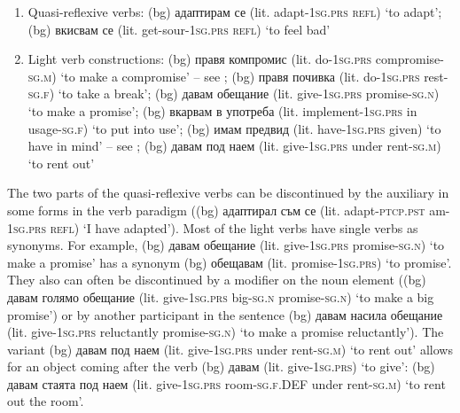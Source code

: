 \documentclass[output=paper,colorlinks,citecolor=brown]{langscibook}
\begin{document}

\begin{enumerate}
    \item Quasi-reflexive verbs: 
    (bg) {адаптирам се } (lit. adapt-\textsc{1sg.prs refl}) {`to adapt'};
    (bg) {вкисвам се } (lit. get-sour-\textsc{1sg.prs refl}) {`to feel bad'}
    \item Light verb constructions: 
    (bg) {правя компромис } (lit. do-\textsc{1sg.prs} compromise-\textsc{sg.m}) {`to make a compromise'} -- see ;
    (bg) {правя почивка } (lit. do-\textsc{1sg.prs} rest-\textsc{sg.f}) {`to take a break'}; 
    (bg) {давам обещание } (lit. give-\textsc{1sg.prs} pro\-mise-\textsc{sg.n}) {`to make a promise'}; 
    (bg) {вкарвам в употреба } (lit. implement-\textsc{1sg.prs} in usage-\textsc{sg.f}) {`to put into use'}; 
    (bg) {имам предвид } (lit. have-\textsc{1sg.prs} given) {`to have in mind'} -- see ;
    (bg) {давам под наем } (lit. give-\textsc{1sg.prs} under rent-\textsc{sg.m}) {`to rent out'}
\end{enumerate} 


The two parts of the quasi-reflexive verbs can be discontinued by the auxiliary in some forms in the verb paradigm 
((bg) {адаптирал съм се } (lit. adapt-\textsc{ptcp.pst} am-\textsc{1sg.prs refl}) {`I have adapted'}). Most of the light verbs have single verbs as synonyms. For example, 
(bg) {давам обещание } (lit. give-\textsc{1sg.prs} promise-\textsc{sg.n}) {`to make a promise'} has a synonym 
(bg) {обещавам } (lit. promise-\textsc{1sg.prs}) {`to promise'}. They also can often be discontinued by a modifier on the noun element ((bg) {давам голямо обещание } (lit. give-\textsc{1sg.prs} big-\textsc{sg.n} promise-\textsc{sg.n}) {`to make a big promise'}) or by another participant in the sentence (bg) {давам насила обещание } (lit. give-\textsc{1sg.prs} reluctantly promise-\textsc{sg.n}) {`to make a promise reluctantly'}). 
The variant (bg) {давам под наем } (lit. give-\textsc{1sg.prs} under rent-\textsc{sg.m}) {`to rent out'} allows for an object coming after the verb 
(bg) {давам } (lit. give-\textsc{1sg.prs}) {`to give'}: 
(bg) {давам стаята под наем } (lit. give-\textsc{1sg.prs} room-\textsc{sg.f}.DEF under rent-\textsc{sg.m}) {`to rent out the room'}. 
\end{document}
